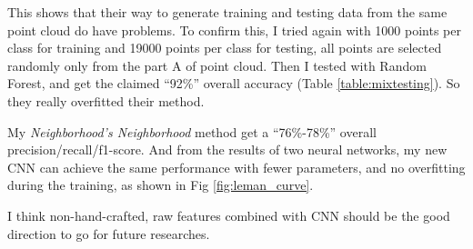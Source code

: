 \documentclass{article}
\begin{document}
This shows that their way to generate training and testing data from the same point cloud do have problems. To confirm this, I tried again with 1000 points per class for training and 19000 points per class for testing, all points are selected randomly only from the part A of point cloud. Then I tested with Random Forest, and get the claimed ``92\%'' overall accuracy (Table \ref{table:mixtesting}). So they really overfitted their method.

\begin{table}[h!]
	\centering
	\caption{Mixing training and testing data gives the claimed results in \cite{hackel2016fast}, but actually an overfitting}
	\label{table:mixtesting}
\end{table}

My \textit{Neighborhood's Neighborhood} method get a ``76\%-78\%'' overall precision/recall/f1-score. And from the results of two neural networks, my new CNN can achieve the same performance with fewer parameters, and no overfitting during the training, as shown in Fig \ref{fig:leman_curve}.

I think non-hand-crafted, raw features combined with CNN should be the good direction to go for future researches.



\end{document}
